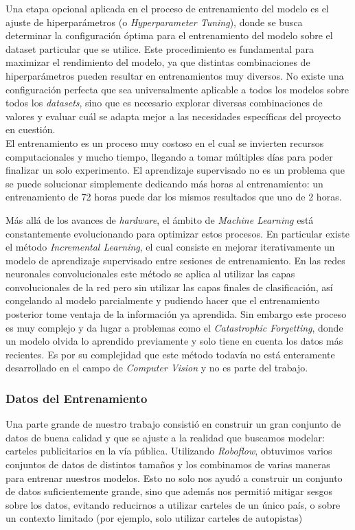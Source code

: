 \documentclass[a4paper]{article}
\begin{document}
Una etapa opcional aplicada en el proceso de entrenamiento del modelo es el ajuste de hiperparámetros (o \textit{Hyperparameter Tuning}), donde se busca determinar la configuración óptima para el entrenamiento del modelo sobre el dataset particular que se utilice. Este procedimiento es fundamental para maximizar el rendimiento del modelo, ya que distintas combinaciones de hiperparámetros pueden resultar en entrenamientos muy diversos. No existe una configuración perfecta que sea universalmente aplicable a todos los modelos sobre todos los \textit{datasets}, sino que es necesario explorar diversas combinaciones de valores y evaluar cuál se adapta mejor a las necesidades específicas del proyecto en cuestión.\\

El entrenamiento es un proceso muy costoso en el cual se invierten recursos computacionales y mucho tiempo, llegando a tomar múltiples días para poder finalizar un solo experimento. El aprendizaje supervisado no es un problema que se puede solucionar simplemente dedicando más horas al entrenamiento: un entrenamiento de 72 horas puede dar los mismos resultados que uno de 2 horas.

Más allá de los avances de \textit{hardware}, el ámbito de \textit{Machine Learning} está constantemente evolucionando para optimizar estos procesos. En particular existe el método \textit{Incremental Learning}, el cual consiste en mejorar iterativamente un modelo de aprendizaje supervisado entre sesiones de entrenamiento. En las redes neuronales convolucionales este método se aplica al utilizar las capas convolucionales de la red pero sin utilizar las capas finales de clasificación, así congelando al modelo parcialmente y pudiendo hacer que el entrenamiento posterior tome ventaja de la información ya aprendida. Sin embargo este proceso es muy complejo y da lugar a problemas como el \textit{Catastrophic Forgetting}, donde un modelo olvida lo aprendido previamente y solo tiene en cuenta los datos más recientes. Es por su complejidad que este método todavía no está enteramente desarrollado en el campo de \textit{Computer Vision} y no es parte del trabajo.

\subsubsection{Datos del Entrenamiento}

Una parte grande de nuestro trabajo consistió en construir un gran conjunto de datos de buena calidad y que se ajuste a la realidad que buscamos modelar: carteles publicitarios en la vía pública. Utilizando \textit{Roboflow}, obtuvimos varios conjuntos de datos de distintos tamaños y los combinamos de varias maneras para entrenar nuestros modelos. Esto no solo nos ayudó a construir un conjunto de datos suficientemente grande, sino que además nos permitió mitigar sesgos sobre los datos, evitando reducirnos a utilizar carteles de un único país, o sobre un contexto limitado (por ejemplo, solo utilizar carteles de autopistas)
\end{document}
